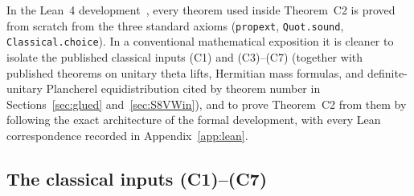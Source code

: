\documentclass[11pt]{amsart}
\theoremstyle{plain}
\theoremstyle{definition}
\numberwithin{equation}{section}
\begin{document}
In the Lean~4 development~\cite{alpoge-remark}, every theorem used inside Theorem~C2 is proved from
scratch from the three standard axioms (\texttt{propext}, \texttt{Quot.sound},
\texttt{Classical.choice}). In a conventional mathematical exposition it is cleaner to isolate
the published classical inputs \textup{(C1)} and \textup{(C3)--(C7)} (together with published
theorems on unitary theta lifts, Hermitian mass formulas, and definite-unitary Plancherel
equidistribution cited by theorem number in Sections~\ref{sec:glued} and~\ref{sec:S8VWin}), and to
prove Theorem~C2 from them by following the exact architecture of the formal development, with
every Lean correspondence recorded in Appendix~\ref{app:lean}.

\subsection{The classical inputs (C1)--(C7)}
\end{document}
